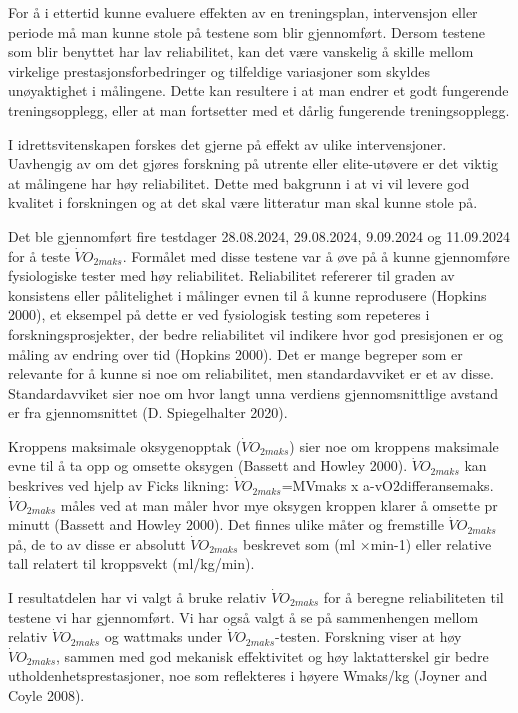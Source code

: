 \documentclass[
  letterpaper,
  DIV=11,
  numbers=noendperiod]{scrreprt}
\begin{document}
For å i ettertid kunne evaluere effekten av en treningsplan,
intervensjon eller periode må man kunne stole på testene som blir
gjennomført. Dersom testene som blir benyttet har lav reliabilitet, kan
det være vanskelig å skille mellom virkelige prestasjonsforbedringer og
tilfeldige variasjoner som skyldes unøyaktighet i målingene. Dette kan
resultere i at man endrer et godt fungerende treningsopplegg, eller at
man fortsetter med et dårlig fungerende treningsopplegg.

I idrettsvitenskapen forskes det gjerne på effekt av ulike
intervensjoner. Uavhengig av om det gjøres forskning på utrente eller
elite-utøvere er det viktig at målingene har høy reliabilitet. Dette med
bakgrunn i at vi vil levere god kvalitet i forskningen og at det skal
være litteratur man skal kunne stole på.

Det ble gjennomført fire testdager 28.08.2024, 29.08.2024, 9.09.2024 og
11.09.2024 for å teste \(\dot{V}O_{2maks}\). Formålet med disse testene
var å øve på å kunne gjennomføre fysiologiske tester med høy
reliabilitet. Reliabilitet refererer til graden av konsistens eller
pålitelighet i målinger evnen til å kunne reprodusere (Hopkins 2000), et
eksempel på dette er ved fysiologisk testing som repeteres i
forskningsprosjekter, der bedre reliabilitet vil indikere hvor god
presisjonen er og måling av endring over tid (Hopkins 2000). Det er
mange begreper som er relevante for å kunne si noe om reliabilitet, men
standardavviket er et av disse. Standardavviket sier noe om hvor langt
unna verdiens gjennomsnittlige avstand er fra gjennomsnittet (D.
Spiegelhalter 2020).

Kroppens maksimale oksygenopptak (\(\dot{V}O_{2maks}\)) sier noe om
kroppens maksimale evne til å ta opp og omsette oksygen (Bassett and
Howley 2000). \(\dot{V}O_{2maks}\) kan beskrives ved hjelp av Ficks
likning: \(\dot{V}O_{2maks}\)=MVmaks x a-vO2differansemaks.
\(\dot{V}O_{2maks}\) måles ved at man måler hvor mye oksygen kroppen
klarer å omsette pr minutt (Bassett and Howley 2000). Det finnes ulike
måter og fremstille \(\dot{V}O_{2maks}\) på, de to av disse er absolutt
\(\dot{V}O_{2maks}\) beskrevet som (ml ×min-1) eller relative tall
relatert til kroppsvekt (ml/kg/min).

I resultatdelen har vi valgt å bruke relativ \(\dot{V}O_{2maks}\) for å
beregne reliabiliteten til testene vi har gjennomført. Vi har også valgt
å se på sammenhengen mellom relativ \(\dot{V}O_{2maks}\) og wattmaks
under \(\dot{V}O_{2maks}\)-testen. Forskning viser at høy
\(\dot{V}O_{2maks}\), sammen med god mekanisk effektivitet og høy
laktatterskel gir bedre utholdenhetsprestasjoner, noe som reflekteres i
høyere Wmaks/kg (Joyner and Coyle 2008).
\end{document}
